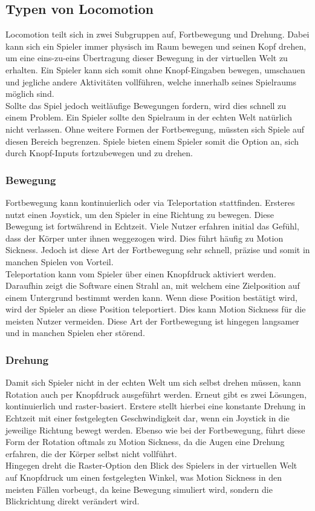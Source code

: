 \subsection{Typen von Locomotion}
Locomotion teilt sich in zwei Subgruppen auf, Fortbewegung und Drehung. Dabei kann sich ein Spieler immer physisch im Raum bewegen und seinen Kopf drehen, um eine eins-zu-eins Übertragung dieser Bewegung in der virtuellen Welt zu erhalten. Ein Spieler kann sich somit ohne Knopf-Eingaben bewegen, umschauen und jegliche andere Aktivitäten vollführen, welche innerhalb seines Spielraums möglich sind.\\
Sollte das Spiel jedoch weitläufige Bewegungen fordern, wird dies schnell zu einem Problem. Ein Spieler sollte den Spielraum in der echten Welt natürlich nicht verlassen. Ohne weitere Formen der Fortbewegung, müssten sich Spiele auf diesen Bereich begrenzen. Spiele bieten einem Spieler somit die Option an, sich durch Knopf-Inputs fortzubewegen und zu drehen.
\subsubsection{Bewegung}
Fortbewegung kann kontinuierlich oder via Teleportation stattfinden. Ersteres nutzt einen Joystick, um den Spieler in eine Richtung zu bewegen. Diese Bewegung ist fortwährend in Echtzeit. Viele Nutzer erfahren initial das Gefühl, dass der Körper unter ihnen weggezogen wird. Dies führt häufig zu Motion Sickness. Jedoch ist diese Art der Fortbewegung sehr schnell, präzise und somit in manchen Spielen von Vorteil.\\
Teleportation kann vom Spieler über einen Knopfdruck aktiviert werden. Daraufhin zeigt die Software einen Strahl an, mit welchem eine Zielposition auf einem Untergrund bestimmt werden kann. Wenn diese Position bestätigt wird, wird der Spieler an diese Position teleportiert. Dies kann Motion Sickness für die meisten Nutzer vermeiden. Diese Art der Fortbewegung ist hingegen langsamer und in manchen Spielen eher störend.

\subsubsection{Drehung}
Damit sich Spieler nicht in der echten Welt um sich selbst drehen müssen, kann Rotation auch per Knopfdruck ausgeführt werden. Erneut gibt es zwei Lösungen, kontinuierlich und raster-basiert. Erstere stellt hierbei eine konstante Drehung in Echtzeit mit einer festgelegten Geschwindigkeit dar, wenn ein Joystick in die jeweilige Richtung bewegt werden. Ebenso wie bei der Fortbewegung, führt diese Form der Rotation oftmals zu Motion Sickness, da die Augen eine Drehung erfahren, die der Körper selbst nicht vollführt.\\
Hingegen dreht die Raster-Option den Blick des Spielers in der virtuellen Welt auf Knopfdruck um einen festgelegten Winkel, was Motion Sickness in den meisten Fällen vorbeugt, da keine Bewegung simuliert wird, sondern die Blickrichtung direkt verändert wird.


